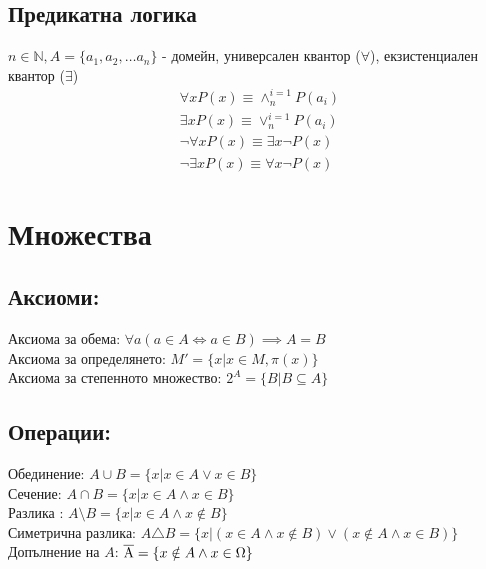 \documentclass[12pt]{article}
\begin{document}
    \subsection*{Предикатна логика}
    \( n \in \mathbb{N}, A = \{ a_1, a_2, \dots a_n \} \) - домейн, универсален квантор (\( \forall \)), екзистенциален квантор (\( \exists \)) \\
    \begin{gather*}
        \forall x P(x) \equiv \land^{i=1}_{n} P(a_i) \\
        \exists x P(x) \equiv \lor^{i=1}_{n} P(a_i) \\
        \neg \forall x P(x) \equiv \exists x \neg P(x) \\
        \neg \exists x P(x) \equiv \forall x \neg P(x)
    \end{gather*}
    \section{Множества}
    \subsection*{Аксиоми:}
    Аксиома за обема: $ \forall a (a \in A \iff a \in B) \implies A=B $ \\
    Аксиома за определянето: $ M'=\{x |  x \in M, \pi (x) \} $ \\
    Аксиома за степенното множество: $ 2^A = \{ B | B \subseteq A \} $
    \subsection*{Операции:}
    Обединение: $ A \cup B = \{ x | x \in A \lor x \in B \} $ \\
    Сечение: $ A \cap B = \{ x | x \in A \land x \in B \} $ \\
    Разлика : $ A \setminus B = \{ x | x \in A \land x \notin B \} $ \\
    Симетрична разлика: $ A \triangle B = \{ x | (x \in A \land x \notin B) \lor (x \notin A \land x \in B) \} $
    Допълнение на $ A $: $ \overline{\rm A} = \{ x \notin A \land x \in \Omega \} $
\end{document}
